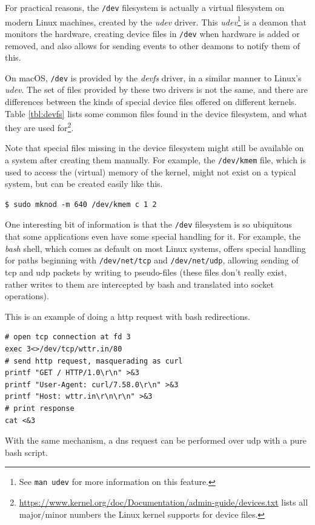 \documentclass[a4paper]{article}
\begin{document}

For practical reasons, the \verb|/dev| filesystem is actually a virtual filesystem on modern Linux machines, created by the \emph{udev} driver. This \emph{udev}\footnote{See \texttt{man udev} for more information on this feature.} is a deamon that monitors the hardware, creating device files in \verb|/dev| when hardware is added or removed, and also allows for sending events to other deamons to notify them of this.


On macOS, \verb|/dev| is provided by the \emph{devfs} driver, in a similar manner to Linux's \emph{udev}. The set of files provided by these two drivers is not the same, and there are differences between the kinds of special device files offered on different kernels. Table \ref{tbl:devfs} lists some common files found in the device filesystem, and what they are used for\footnote{\url{https://www.kernel.org/doc/Documentation/admin-guide/devices.txt} lists all major/minor numbers the Linux kernel supports for device files.}.

Note that special files missing in the device filesystem might still be available on a system after creating them manually. For example, the \verb|/dev/kmem| file, which is used to access the (virtual) memory of the kernel, might not exist on a typical system, but can be created easily like this.

\begin{verbatim}
$ sudo mknod -m 640 /dev/kmem c 1 2
\end{verbatim}
One interesting bit of information is that the \verb|/dev| filesystem is so ubiquitous that some applications even have some special handling for it. For example, the \emph{bash} shell, which comes as default on most Linux systems, offers special handling for paths beginning with \verb|/dev/net/tcp| and \verb|/dev/net/udp|, allowing sending of \gls{tcp} and \gls{udp} packets by writing to pseudo-files\cite{bash-redir-net} (these files don't really exist, rather writes to them are intercepted by bash and translated into socket operations).

This is an example of doing a \gls{http} request with bash redirections.

\begin{verbatim}
# open tcp connection at fd 3
exec 3<>/dev/tcp/wttr.in/80
# send http request, masquerading as curl
printf "GET / HTTP/1.0\r\n" >&3
printf "User-Agent: curl/7.58.0\r\n" >&3
printf "Host: wttr.in\r\n\r\n" >&3
# print response
cat <&3
\end{verbatim}
With the same mechanism, a \gls{dns} request can be performed over \gls{udp} with a pure bash script.
\end{document}
